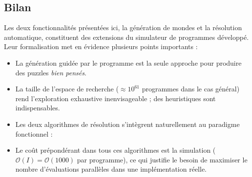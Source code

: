 \subsection{Bilan}

Les deux fonctionnalités présentées ici, la génération de mondes et la résolution automatique, constituent des extensions du simulateur de programmes développé. Leur formalisation met en évidence plusieurs points importants :

\begin{itemize}
  \item La génération guidée par le programme est la seule approche pour produire des puzzles \textit{bien pensés}.
  \item La taille de l'espace de recherche ($\approx 10^{61}$ programmes dans le cas général) rend l'exploration exhaustive inenvisageable ; des heuristiques sont indispensables.
  \item Les deux algorithmes de résolution s'intègrent naturellement au paradigme fonctionnel :
  \item Le coût prépondérant dans tous ces algorithmes est la simulation ($\mathcal{O}(I) = \mathcal{O}(1000)$ par programme), ce qui justifie le besoin de maximiser le nombre d'évaluations parallèles dans une implémentation réelle.
\end{itemize}
